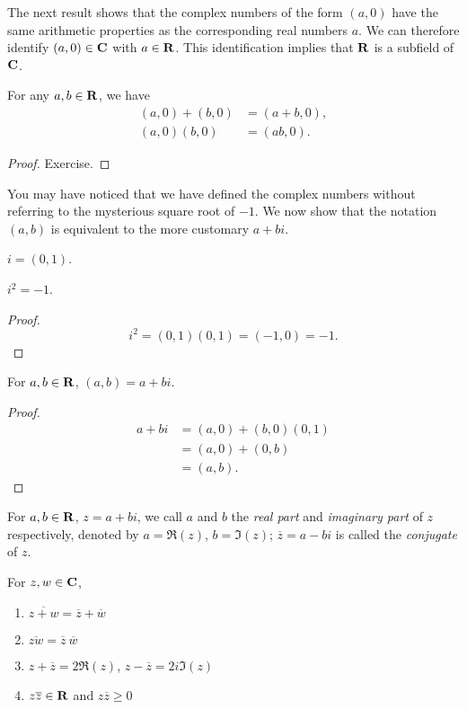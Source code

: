The next result shows that the complex numbers of the form $(a,0)$ have the same arithmetic properties as the corresponding real numbers $a$. We can therefore identify $(a,0)\in\mathbf C$ with $a\in\mathbf R$. This identification implies that $\mathbf R$ is a subfield of $\mathbf C$.

\begin{proposition}
For any $a,b\in\mathbf R$, we have
\begin{align*}
(a,0)+(b,0)&=(a+b,0),\\
(a,0)(b,0)&=(ab,0).
\end{align*}
\end{proposition}

\begin{proof}
Exercise.
\end{proof}

You may have noticed that we have defined the complex numbers without referring to the mysterious square root of $-1$. We now show that the notation $(a,b)$ is equivalent to the more customary $a+bi$.

\begin{definition}
$i=(0,1)$.
\end{definition}

\begin{proposition}
$i^2=-1$.
\end{proposition}

\begin{proof}
\[i^2=(0,1)(0,1)=(-1,0)=-1.\]
\end{proof}

\begin{proposition}
For $a,b\in\mathbf R$, $(a,b)=a+bi$.
\end{proposition}

\begin{proof}
\begin{align*}
a+bi&=(a,0)+(b,0)(0,1)\\
&=(a,0)+(0,b)\\
&=(a,b).
\end{align*}
\end{proof}

\begin{definition}
For $a,b\in\mathbf R$, $z=a+bi$, we call $a$ and $b$ the \emph{real part} and \emph{imaginary part} of $z$ respectively, denoted by $a=\Re(z)$, $b=\Im(z)$; $\overline{z}=a-bi$ is called the \emph{conjugate} of $z$.
\end{definition}

\begin{proposition}
For $z,w\in\mathbf C$,
\begin{enumerate}[label=(\roman*)]
\item $\overline{z+w}=\overline{z}+\overline{w}$
\item $\overline{zw}=\overline{z}\:\overline{w}$
\item $z+\overline{z}=2\Re(z)$, $z-\overline{z}=2i\Im(z)$
\item $z\overline{z}\in\mathbf R$ and $z\overline{z}\ge0$
\end{enumerate}
\end{proposition}

